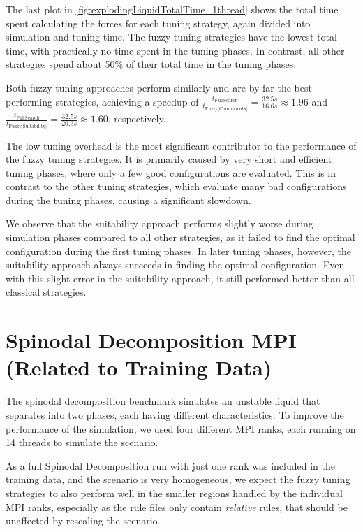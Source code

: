 The last plot in \autoref{fig:explodingLiquidTotalTime_1thread} shows the total time spent calculating the forces for each tuning strategy, again divided into simulation and tuning time. The fuzzy tuning strategies have the lowest total time, with practically no time spent in the tuning phases. In contrast, all other strategies spend about 50\% of their total time in the tuning phases.

Both fuzzy tuning approaches perform similarly and are by far the best-performing strategies, achieving a speedup of $\frac{t_{\text{FullSearch}}}{t_{\text{Fuzzy[Components]}}} = \frac{32.5s}{16.6s} \approx 1.96$ and $\frac{t_{\text{FullSearch}}}{t_{\text{Fuzzy[Suitability]}}} = \frac{32.5s}{20.3s} \approx 1.60$, respectively.

The low tuning overhead is the most significant contributor to the performance of the fuzzy tuning strategies. It is primarily caused by very short and efficient tuning phases, where only a few good configurations are evaluated. This is in contrast to the other tuning strategies, which evaluate many bad configurations during the tuning phases, causing a significant slowdown.

We observe that the suitability approach performs slightly worse during simulation phases compared to all other strategies, as it failed to find the optimal configuration during the first tuning phases. In later tuning phases, however, the suitability approach always succeeds in finding the optimal configuration. Even with this slight error in the suitability approach, it still performed better than all classical strategies.


\section{Spinodal Decomposition MPI (Related to Training Data)}

The spinodal decomposition benchmark simulates an unstable liquid that separates into two phases, each having different characteristics. To improve the performance of the simulation, we used four different MPI ranks, each running on 14 threads to simulate the scenario.

As a full Spinodal Decomposition run with just one rank was included in the training data, and the scenario is very homogeneous, we expect the fuzzy tuning strategies to also perform well in the smaller regions handled by the individual MPI ranks, especially as the rule files only contain \emph{relative} rules, that should be unaffected by rescaling the scenario.

